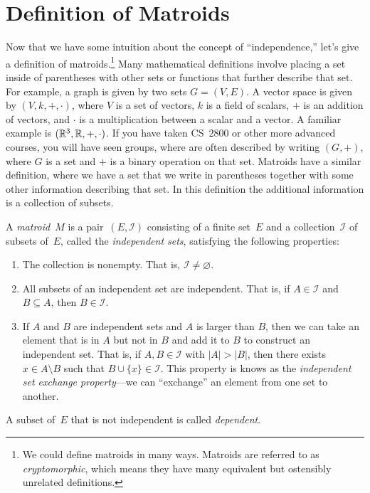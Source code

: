 \documentclass[twoside]{article}
\newcommand{\I}{\mathcal{I}}
\begin{document}

\section{Definition of Matroids}

Now that we have some intuition about the concept of ``independence,'' let's give a definition of matroids.\footnote{
  We could define matroids in many ways.
  Matroids are referred to as \emph{cryptomorphic}, which means they have many equivalent but ostensibly unrelated definitions.}
Many mathematical definitions involve placing a set inside of parentheses with other sets or functions that further describe that set.
For example, a graph is given by two sets ${G = (V, E)}$.
A vector space is given by ${(V, k, +, \cdot)}$, where $V$ is a set of vectors, $k$ is a field of scalars, $+$ is an addition of vectors, and $\cdot$ is a multiplication between a scalar and a vector.
A familiar example is ${(\mathbb{R}^3, \mathbb{R}, +, \cdot)}$.
If you have taken CS~$2800$ or other more advanced courses, you will have seen groups, where are often described by writing ${(G, +)}$, where $G$ is a set and $+$ is a binary operation on that set.
Matroids have a similar definition, where we have a set that we write in parentheses together with some other information describing that set.
In this definition the additional information is a collection of subsets.

\begin{defn}[Matroid]
  A \emph{matroid}~$M$ is a pair~$(E, \I)$ consisting of a finite set~$E$ and a collection~$\I$ of subsets of~$E$, called the \emph{independent sets}, satisfying the following properties:
  \begin{enumerate}
    \item The collection is nonempty.
      That is, ${\I \ne \varnothing}$.
    \item All subsets of an independent set are independent.
      That is, if ${A \in \I}$ and ${B \subseteq A}$, then ${B \in \I}$.
    \item If $A$ and $B$ are independent sets and $A$ is larger than $B$, then we can take an element that is in $A$ but not in $B$ and add it to $B$ to construct an independent set.
    That is, if ${A, B \in \I}$ with ${|A| > |B|}$, then there exists ${x \in A \setminus B}$ such that ${B \cup \{x\} \in \I}$.
    This property is knows as the \emph{independent set exchange property}---we can ``exchange'' an element from one set to another.
  \end{enumerate}
  A subset of~$E$ that is not independent is called \emph{dependent}.
\end{defn}
\end{document}
